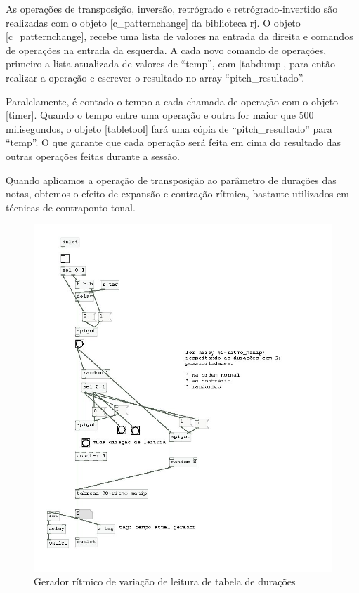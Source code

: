 \documentclass[draft]{ppgmus}
\begin{document}
As operações de transposição, inversão, retrógrado e retrógrado-invertido são 
realizadas com o objeto [c\_patternchange] da biblioteca rj. 
O objeto [c\_patternchange], recebe uma lista de valores na entrada
da direita e comandos de operações na entrada da esquerda. A cada novo
comando de operações, primeiro a lista atualizada de valores de ``temp'', 
com [tabdump], para então realizar a operação e escrever o resultado no
array ``pitch\_resultado''.

Paralelamente, é contado o tempo a cada chamada de operação com o objeto
[timer]. Quando o tempo entre uma operação e outra for maior que 500 milisegundos,
o objeto [tabletool] fará uma cópia de ``pitch\_resultado'' para ``temp''. O 
que garante que cada operação será feita em cima do resultado das outras operações
feitas durante a sessão. 

Quando aplicamos a operação de transposição ao parâmetro
de durações das notas, obtemos o efeito de expansão e contração
rítmica, bastante utilizados em técnicas de contraponto tonal.

\begin{figure}
\includegraphics[scale=.6]{gerador-ritmico1}
\caption{Gerador rítmico de variação de leitura de tabela de durações}
\label{gera-ritmico1}
\end{figure}  
\end{document}
